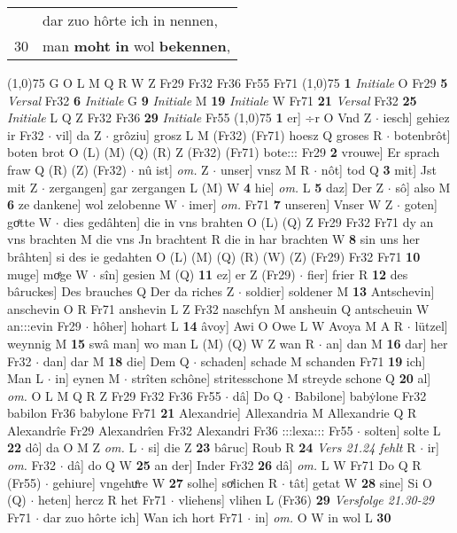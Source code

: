 \documentclass[8pt,a4paper,notitlepage]{article}
\begin{document}
\begin{table}[ht]
\begin{minipage}[t]{0.5\linewidth}
\begin{tabular}{rl}
 & dar zuo hôrte ich in nennen,\\ 
30 & man \textbf{moht} \textbf{in} wol \textbf{bekennen},\\ 
\end{tabular}
\scriptsize
\line(1,0){75} \newline
G O L M Q R W Z Fr29 Fr32 Fr36 Fr55 Fr71 \newline
\line(1,0){75} \newline
\textbf{1} \textit{Initiale} O Fr29  \textbf{5} \textit{Versal} Fr32  \textbf{6} \textit{Initiale} G  \textbf{9} \textit{Initiale} M  \textbf{19} \textit{Initiale} W Fr71  \textbf{21} \textit{Versal} Fr32  \textbf{25} \textit{Initiale} L Q Z Fr32 Fr36  \textbf{29} \textit{Initiale} Fr55  \newline
\line(1,0){75} \newline
\textbf{1} er] ÷r O Vnd Z  $\cdot$ iesch] gehiez ir Fr32  $\cdot$ vil] da Z  $\cdot$ grôziu] grosz L M (Fr32) (Fr71) hoesz Q groses R  $\cdot$ botenbrôt] boten brot O (L) (M) (Q) (R) Z (Fr32) (Fr71) bote::: Fr29 \textbf{2} vrouwe] Er sprach fraw Q (R) (Z) (Fr32)  $\cdot$ nû ist] \textit{om.} Z  $\cdot$ unser] vnsz M R  $\cdot$ nôt] tod Q \textbf{3} mit] Jst mit Z  $\cdot$ zergangen] gar zergangen L (M) W \textbf{4} hie] \textit{om.} L \textbf{5} daz] Der Z  $\cdot$ sô] also M \textbf{6} ze dankene] wol zelobenne W  $\cdot$ imer] \textit{om.} Fr71 \textbf{7} unseren] Vnser W Z  $\cdot$ goten] goͤtte W  $\cdot$ dies gedâhten] die in vns brahten O (L) (Q) Z Fr29 Fr32 Fr71 dy an vns brachten M die vns Jn brachtent R die in har brachten W \textbf{8} sin uns her brâhten] si des ie gedahten O (L) (M) (Q) (R) (W) (Z) (Fr29) Fr32 Fr71 \textbf{10} muge] moͤge W  $\cdot$ sîn] gesien M (Q) \textbf{11} ez] er Z (Fr29)  $\cdot$ fier] frier R \textbf{12} des bâruckes] Des brauches Q Der da riches Z  $\cdot$ soldier] soldener M \textbf{13} Antschevin] anschevin O R Fr71 anshevin L Z Fr32 naschfyn M ansheuin Q antscheuin W an:::evin Fr29  $\cdot$ hôher] hohart L \textbf{14} âvoy] Awi O Owe L W Avoya M A R  $\cdot$ lützel] weynnig M \textbf{15} swâ man] wo man L (M) (Q) W Z wan R  $\cdot$ an] dan M \textbf{16} dar] her Fr32  $\cdot$ dan] dar M \textbf{18} die] Dem Q  $\cdot$ schaden] schade M schanden Fr71 \textbf{19} ich] Man L  $\cdot$ in] eynen M  $\cdot$ strîten schône] stritesschone M streyde schone Q \textbf{20} al] \textit{om.} O L M Q R Z Fr29 Fr32 Fr36 Fr55  $\cdot$ dâ] Do Q  $\cdot$ Babilone] babẏlone Fr32 babilon Fr36 babylone Fr71 \textbf{21} Alexandrie] Allexandria M Allexandrie Q R Alexandrîe Fr29 Alexandrîen Fr32 Alexandri Fr36 :::lexa::: Fr55  $\cdot$ solten] solte L \textbf{22} dô] da O M Z \textit{om.} L  $\cdot$ si] die Z \textbf{23} bâruc] Roub R \textbf{24} \textit{Vers 21.24 fehlt} R   $\cdot$ ir] \textit{om.} Fr32  $\cdot$ dâ] do Q W \textbf{25} an der] Inder Fr32 \textbf{26} dâ] \textit{om.} L W Fr71 Do Q R (Fr55)  $\cdot$ gehiure] vngehuͤre W \textbf{27} solhe] soͯlichen R  $\cdot$ tât] getat W \textbf{28} sine] Si O (Q)  $\cdot$ heten] hercz R het Fr71  $\cdot$ vliehens] vlihen L (Fr36) \textbf{29} \textit{Versfolge 21.30-29} Fr71   $\cdot$ dar zuo hôrte ich] Wan ich hort Fr71  $\cdot$ in] \textit{om.} O W in wol L \textbf{30} 
\end{minipage}
\end{table}
\end{document}
